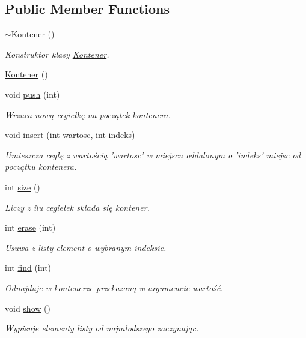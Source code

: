 \subsection*{Public Member Functions}
\begin{DoxyCompactItemize}
\item 
\hyperlink{classls_1_1_kontener_a52711b1bc80413d48840ce8071a427fa}{$\sim$\-Kontener} ()
\begin{DoxyCompactList}\small\item\em Konstruktor klasy \hyperlink{classls_1_1_kontener}{Kontener}. \end{DoxyCompactList}\item 
\hyperlink{classls_1_1_kontener_a1c8f0e384b9d8e945ee70354eb144657}{Kontener} ()
\item 
void \hyperlink{classls_1_1_kontener_a911b275202510df1f321f8da26f0aa34}{push} (int)
\begin{DoxyCompactList}\small\item\em Wrzuca nową cegiełkę na początek kontenera. \end{DoxyCompactList}\item 
void \hyperlink{classls_1_1_kontener_a09517b6ec268d37744b1abbc7b7df5bb}{insert} (int wartosc, int indeks)
\begin{DoxyCompactList}\small\item\em Umieszcza cegłę z wartością 'wartosc' w miejscu oddalonym o 'indeks' miejsc od początku kontenera. \end{DoxyCompactList}\item 
int \hyperlink{classls_1_1_kontener_a248ac01db2477296b265fb0ea07a8c1c}{size} ()
\begin{DoxyCompactList}\small\item\em Liczy z ilu cegiełek składa się kontener. \end{DoxyCompactList}\item 
int \hyperlink{classls_1_1_kontener_a3b9fed0ce54e6232bd2868bf4b3801ec}{erase} (int)
\begin{DoxyCompactList}\small\item\em Usuwa z listy element o wybranym indeksie. \end{DoxyCompactList}\item 
int \hyperlink{classls_1_1_kontener_a04841df56a29d488e5e0d1a292646dde}{find} (int)
\begin{DoxyCompactList}\small\item\em Odnajduje w kontenerze przekazaną w argumencie wartość. \end{DoxyCompactList}\item 
void \hyperlink{classls_1_1_kontener_a75014b0a40e25ac573e2242d50522e08}{show} ()
\begin{DoxyCompactList}\small\item\em Wypisuje elementy listy od najmłodszego zaczynając. \end{DoxyCompactList}\end{DoxyCompactItemize}
